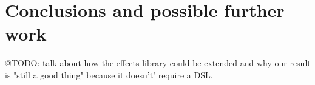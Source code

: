 \section{Conclusions and possible further work}

@TODO: talk about how the effects library could be extended and why our result
is "still a good thing" because it doesn't' require a DSL.
